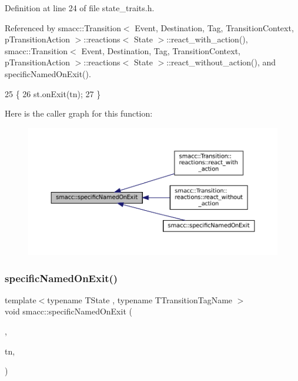 Definition at line 24 of file state\+\_\+traits.\+h.



Referenced by smacc\+::\+Transition$<$ Event, Destination, Tag, Transition\+Context, p\+Transition\+Action $>$\+::reactions$<$ State $>$\+::react\+\_\+with\+\_\+action(), smacc\+::\+Transition$<$ Event, Destination, Tag, Transition\+Context, p\+Transition\+Action $>$\+::reactions$<$ State $>$\+::react\+\_\+without\+\_\+action(), and specific\+Named\+On\+Exit().


\begin{DoxyCode}
25     \{
26         st.onExit(tn);
27     \}
\end{DoxyCode}
Here is the caller graph for this function\+:
\nopagebreak
\begin{figure}[H]
\begin{center}
\leavevmode
\includegraphics[width=350pt]{namespacesmacc_afd94fcb8f8c410a0ced7954bf76e845d_icgraph}
\end{center}
\end{figure}
\mbox{\label{namespacesmacc_ab1896cb023506b0a47d26d32cc078eb4}} 
\subsubsection{\texorpdfstring{specific\+Named\+On\+Exit()}{specificNamedOnExit()}\hspace{0.1cm}{\footnotesize\ttfamily [2/3]}}
{\footnotesize\ttfamily template$<$typename T\+State , typename T\+Transition\+Tag\+Name $>$ \\
void smacc\+::specific\+Named\+On\+Exit (\begin{DoxyParamCaption}\item[{T\+State \&}]{,  }\item[{T\+Transition\+Tag\+Name}]{tn,  }\item[{std\+::false\+\_\+type}]{ }\end{DoxyParamCaption})}



